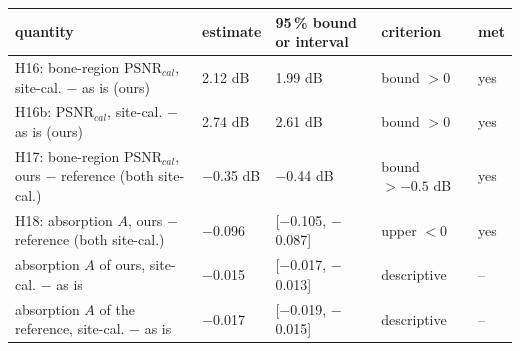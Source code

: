 \begin{tabular}{lllll}
\toprule
quantity & estimate & 95\,\% bound or interval & criterion & met \\
\midrule
H16: bone-region PSNR$_{cal}$, site-cal. $-$ as is (ours) & 2.12 dB & 1.99 dB & bound $>0$ & yes \\
H16b: PSNR$_{cal}$, site-cal. $-$ as is (ours) & 2.74 dB & 2.61 dB & bound $>0$ & yes \\
H17: bone-region PSNR$_{cal}$, ours $-$ reference (both site-cal.) & $-$0.35 dB & $-$0.44 dB & bound $>-0.5$ dB & yes \\
H18: absorption $A$, ours $-$ reference (both site-cal.) & $-$0.096 & [$-$0.105, $-$0.087] & upper $<0$ & yes \\
absorption $A$ of ours, site-cal. $-$ as is & $-$0.015 & [$-$0.017, $-$0.013] & descriptive & -- \\
absorption $A$ of the reference, site-cal. $-$ as is & $-$0.017 & [$-$0.019, $-$0.015] & descriptive & -- \\
\bottomrule
\end{tabular}
